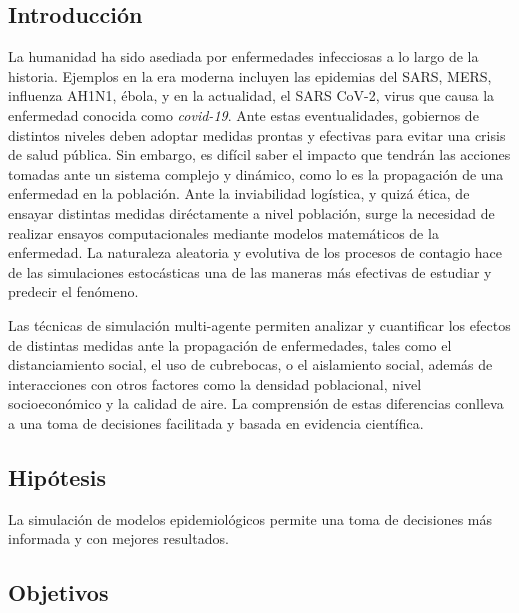 \documentclass[a4]{sciposter}
\begin{document}
\begin{multicols}{2}

\section{Introducción}
La humanidad ha sido asediada por enfermedades infecciosas a lo largo de la historia. Ejemplos en la era moderna incluyen las epidemias del SARS, MERS, influenza AH1N1, ébola, y en la actualidad, el SARS CoV-2, virus que causa la enfermedad conocida como \emph{covid-19}. Ante estas eventualidades, gobiernos de distintos niveles deben adoptar medidas prontas y efectivas para evitar una crisis de salud pública. Sin embargo, es difícil saber el impacto que tendrán las acciones tomadas ante un sistema complejo y dinámico, como lo es la propagación de una enfermedad en la población. Ante la inviabilidad logística, y quizá ética, de ensayar distintas medidas diréctamente a nivel población, surge la necesidad de realizar ensayos computacionales mediante modelos matemáticos de la enfermedad. La naturaleza aleatoria y evolutiva de los procesos de contagio hace de las simulaciones estocásticas una de las maneras más efectivas de estudiar y predecir el fenómeno.

Las técnicas de simulación multi-agente permiten analizar y cuantificar los efectos de distintas medidas ante la propagación de enfermedades, tales como el distanciamiento social, el uso de cubrebocas, o el aislamiento social, además de interacciones con otros factores como la densidad poblacional, nivel socioeconómico y la calidad de aire. La comprensión de estas diferencias conlleva a una toma de decisiones facilitada y basada en evidencia científica. 

\subsection*{Hipótesis}

La simulación de modelos epidemiológicos permite una toma de decisiones más informada y con mejores resultados.

\subsection*{Objetivos}


\end{multicols}
\end{document}

